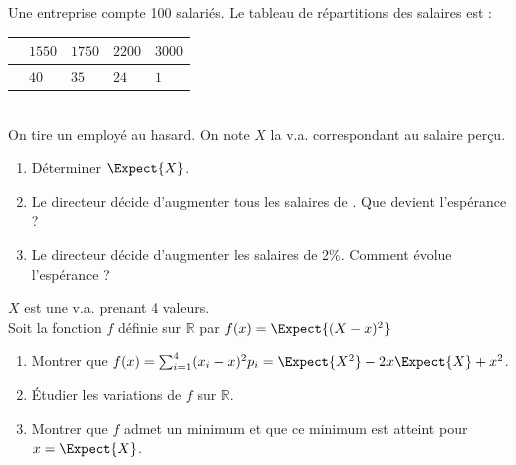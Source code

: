 \documentclass[main.tex]{subfiles}
\begin{document}
\vspace{-1.5em} 
\begin{exercise} Une entreprise compte 100 salariés. Le tableau de répartitions des salaires est  :\\
	\renewcommand{\arraystretch}{1.25} 
	\null	\hfill \begin{tabularx}{0.7\linewidth}{|c|Y|Y|Y|Y|}
		\hline
		 & $1550$ & $1750$ & $2200$ & $3000$ \\ \hline
		 & $40$ & $35$  & $24$  & $1$  \\\hline
	\end{tabularx} 
	\hfill \null\\
	On tire un employé au hasard. On note $X$ la v.a. correspondant au salaire perçu.
	\begin{enumerate}[label={\arabic*)},leftmargin=*]  
		\item Déterminer $\Expect{X}$.
		\item Le directeur décide d'augmenter tous les salaires de . Que devient l'espérance ?
		\item Le directeur décide d'augmenter les salaires de 2\%. Comment évolue l'espérance ?
	\end{enumerate}
\end{exercise}
\begin{exercise}  $X$ est une v.a. prenant 4 valeurs. \\
Soit la fonction $f$ définie sur $\mathbb{R}$ par $f(x)=\Expect{(X-x)^2}$
	\begin{enumerate}[label={\arabic*)},leftmargin=*]  
		\item Montrer que $f(x)=\sum_{i=1}^4(x_i-x)^2p_i=\Expect{X^2}-2x\Expect{X}+x^2$.
		\item Étudier les variations de $f$ sur $\mathbb{R}$.
		\item Montrer que $f$ admet un minimum et que ce minimum est atteint pour $x=\Expect{X}$.
	\end{enumerate}
\end{exercise}
\end{document}
